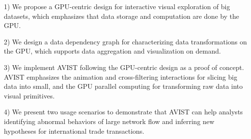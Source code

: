 1) We propose a GPU-centric design for interactive visual exploration of big datasets, which emphasizes that data storage and computation are done by the GPU.

2) We design a data dependency graph for characterizing data transformations on the GPU, which supports data aggregation and visualization on demand.

3) We implement  AVIST following the GPU-centric design as a proof of concept. AVIST emphasizes  the  animation and cross-filtering interactions for slicing big data into small, and the GPU parallel computing for transforming raw data into visual primitives. 

4) We present two usage scenarios to demonstrate that  AVIST can help analysts identifying abnormal behaviors of large network flow and inferring new hypotheses for international trade transactions.     



